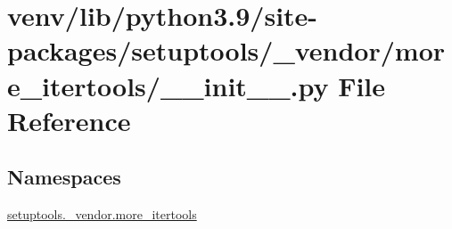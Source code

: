 \hypertarget{venv_2lib_2python3_89_2site-packages_2setuptools_2__vendor_2more__itertools_2____init_____8py}{}\section{venv/lib/python3.9/site-\/packages/setuptools/\+\_\+vendor/more\+\_\+itertools/\+\_\+\+\_\+init\+\_\+\+\_\+.py File Reference}
\label{venv_2lib_2python3_89_2site-packages_2setuptools_2__vendor_2more__itertools_2____init_____8py}
\subsection*{Namespaces}
\begin{DoxyCompactItemize}
\item 
 \hyperlink{namespacesetuptools_1_1__vendor_1_1more__itertools}{setuptools.\+\_\+vendor.\+more\+\_\+itertools}
\end{DoxyCompactItemize}
